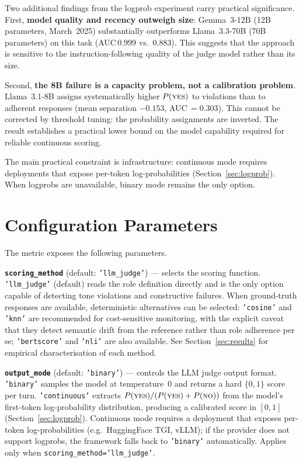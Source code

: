 \documentclass[11pt,a4paper]{article}
\begin{document}
Two additional findings from the logprob experiment carry practical
significance. First, \textbf{model quality and recency outweigh size}:
Gemma~3-12B (12B parameters, March~2025) substantially outperforms
Llama~3.3-70B (70B parameters) on this task (AUC\,$0.999$
vs.~$0.883$). This suggests that the approach is sensitive to the
instruction-following quality of the judge model rather than its size.

Second, \textbf{the 8B failure is a capacity problem, not a calibration
problem}. Llama~3.1-8B assigns systematically higher $P(\textsc{yes})$ to
violations than to adherent responses (mean separation $-0.153$,
AUC\,$= 0.303$). This cannot be corrected by threshold tuning: the
probability assignments are inverted. The result establishes a practical
lower bound on the model capability required for reliable continuous scoring.

The main practical constraint is infrastructure: continuous mode requires
deployments that expose per-token log-probabilities
(Section~\ref{sec:logprob}). When logprobs are unavailable, binary mode
remains the only option.

\section{Configuration Parameters}
\label{sec:scoring_params}

The metric exposes the following parameters.

\textbf{\texttt{scoring\_method}} (default: \texttt{'llm\_judge'}) ---
selects the scoring function. \texttt{'llm\_judge'} (default) reads the
role definition directly and is the only option capable of detecting tone
violations and constructive failures. When ground-truth responses are
available, deterministic alternatives can be selected: \texttt{'cosine'}
and \texttt{'knn'} are recommended for cost-sensitive monitoring, with the
explicit caveat that they detect semantic drift from the reference rather
than role adherence per se; \texttt{'bertscore'} and \texttt{'nli'} are
also available. See Section~\ref{sec:results} for empirical characterisation
of each method.

\textbf{\texttt{output\_mode}} (default: \texttt{'binary'}) --- controls
the LLM judge output format. \texttt{'binary'} samples the model at
temperature~0 and returns a hard $\{0, 1\}$ score per turn.
\texttt{'continuous'} extracts $P(\textsc{yes}) / (P(\textsc{yes}) +
P(\textsc{no}))$ from the model's first-token log-probability distribution,
producing a calibrated score in $[0, 1]$ (Section~\ref{sec:logprob}).
Continuous mode requires a deployment that exposes per-token log-probabilities
(e.g.\ HuggingFace TGI, vLLM); if the provider does not support logprobs,
the framework falls back to \texttt{'binary'} automatically. Applies only
when \texttt{scoring\_method='llm\_judge'}.
\end{document}
